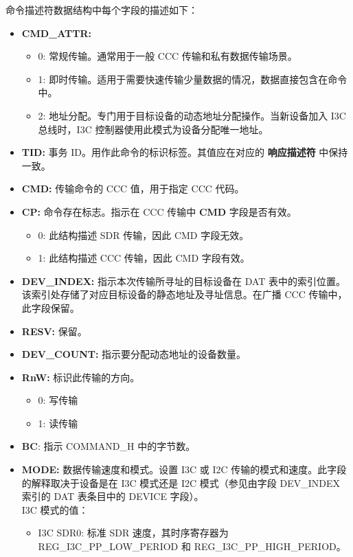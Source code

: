 \documentclass[main\_\_CN.tex]{subfiles}
\begin{document}
命令描述符数据结构中每个字段的描述如下：
\begin{itemize}
    \item \textbf{CMD\_ATTR:}
    \begin{itemize}
        \item 0: 常规传输。通常用于一般 CCC 传输和私有数据传输场景。
        \item 1: 即时传输。适用于需要快速传输少量数据的情况，数据直接包含在命令中。
        \item 2: 地址分配。专门用于目标设备的动态地址分配操作。当新设备加入 I3C 总线时，I3C 控制器使用此模式为设备分配唯一地址。
    \end{itemize}
    \item \textbf{TID:} 事务 ID。用作此命令的标识标签。其值应在对应的 \textbf{响应描述符} 中保持一致。
    \item \textbf{CMD:} 传输命令的 CCC 值，用于指定 CCC 代码。
    \item \textbf{CP:} 命令存在标志。指示在 CCC 传输中 \textbf{CMD} 字段是否有效。
    \begin{itemize}
        \item 0: 此结构描述 SDR 传输，因此 CMD 字段无效。
        \item 1: 此结构描述 CCC 传输，因此 CMD 字段有效。
    \end{itemize}
    \item \textbf{DEV\_INDEX:} 指示本次传输所寻址的目标设备在 DAT 表中的索引位置。该索引处存储了对应目标设备的静态地址及寻址信息。在广播 CCC 传输中，此字段保留。
    \item \textbf{RESV:} 保留。
    \item \textbf{DEV\_COUNT:} 指示要分配动态地址的设备数量。
    \item \textbf{RnW:} 标识此传输的方向。
    \begin{itemize}
        \item 0: 写传输
        \item 1: 读传输
    \end{itemize}
    \item \textbf{BC}: 指示 COMMAND\_H 中的字节数。
    \item \textbf{MODE:} 数据传输速度和模式。设置 I3C 或 I2C 传输的模式和速度。此字段的解释取决于设备是在 I3C 模式还是 I2C 模式（参见由字段 DEV\_INDEX 索引的 DAT 表条目中的 DEVICE 字段）。\\
    I3C 模式的值：
    \begin{itemize}
        \item I3C SDR0: 标准 SDR 速度，其时序寄存器为 REG\_I3C\_PP\_LOW\_PERIOD 和 REG\_I3C\_PP\_HIGH\_PERIOD。

\end{itemize}
\end{itemize}
\end{document}
